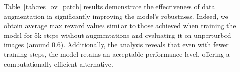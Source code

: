 Table~\ref{tab:res_ov_patch} results demonstrate the effectiveness of data augmentation in significantly improving the model's robustness.
Indeed, we obtain average max reward values similar to those achieved when training the model for 5k steps
without augmentations and evaluating it on unperturbed images (around 0.6).
Additionally, the analysis reveals that even with fewer training steps, the model retains an acceptable performance level, offering a computationally efficient alternative.